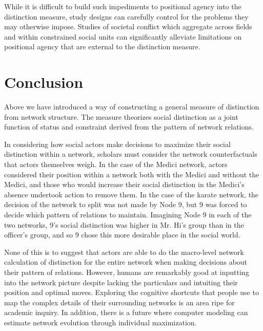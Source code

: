 \documentclass[12pt]{article}
\begin{document}
While it is difficult to build such impediments to positional agency into the distinction measure, study designs can carefully control for the problems they may otherwise impose. Studies of societal conflict which aggregate across fields and within constrained social units can significantly alleviate limitations on positional agency that are external to the distinction measure.  

\section{Conclusion}
Above we have introduced a way of constructing a general measure of distinction from network structure. The measure theorizes social distinction as a joint function of status and constraint derived from the pattern of network relations. 

In considering how social actors make decisions to maximize their social distinction within a network, scholars must consider the network counterfactuals that actors themselves weigh. In the case of the Medici network, actors considered their position within a network both with the Medici and without the Medici, and those who would increase their social distinction in the Medici’s absence undertook action to remove them. In the case of the karate network, the decision of the network to split was not made by Node 9, but 9 was forced to decide which pattern of relations to maintain. Imagining Node 9 in each of the two networks, 9’s social distinction was higher in Mr. Hi’s group than in the officer’s group, and so 9 chose this more desirable place in the social world. 

None of this is to suggest that actors are able to do the macro-level network calculation of distinction for the entire network when making decisions about their pattern of relations. However, humans are remarkably good at inputting into the network picture despite lacking the particulars and intuiting their position and optimal moves. Exploring the cognitive shortcuts that people use to map the complex details of their surrounding networks is an area ripe for academic inquiry. In addition, there is a future where computer modeling can estimate network evolution through individual maximization. 
\end{document}
